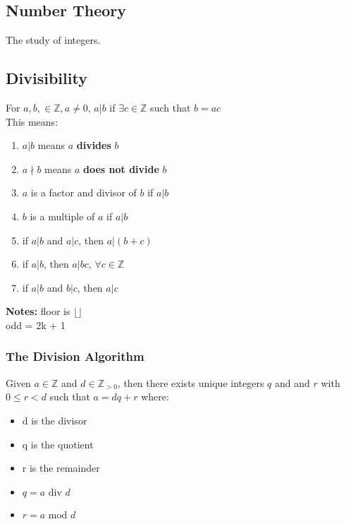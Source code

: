 \documentclass[letter]{article}
\begin{document}
\begin{multicols}{2}
  \section{Number Theory}\noindent
  The study of integers.
  \subsection{Divisibility}\noindent
  For $a, b, \in \mathbb{Z}, a \neq 0$, $a|b$ if $\exists c \in \mathbb{Z}$ such
  that $b = ac$\\
  This means:
  \begin{enumerate}[noitemsep]
      \item $a|b$ means $a$ \textbf{divides} $b$
      \item $a \nmid b$ means $a$ \textbf{does not divide} $b$
      \item $a$ is a factor and divisor of $b$ if $a|b$
      \item $b$ is a multiple of $a$ if $a|b$
	\item if $a|b$ and $a|c$, then $a|(b+c)$
	\item if $a|b$, then $a|bc$, $\forall c \in \mathbb{Z}$
	\item if $a|b$ and $b|c$, then $a|c$
  \end{enumerate}
  \textbf{Notes:} floor is $\lfloor \rfloor$\\
  odd = 2k + 1

  \subsubsection{The Division Algorithm}\noindent
  Given $a \in \mathbb{Z}$ and $d \in \mathbb{Z}_{>0}$, then there exists unique
  integers $q$ and and $r$ with $0 \leq r < d$ such that $a = dq + r$ where:
  \begin{itemize}[noitemsep]
	  \item d is the divisor
	  \item q is the quotient
	  \item r is the remainder
	  \item $q = a \text{ div } d$
	  \item $r = a \text{ mod } d$
  \end{itemize}


\end{multicols}
\end{document}
